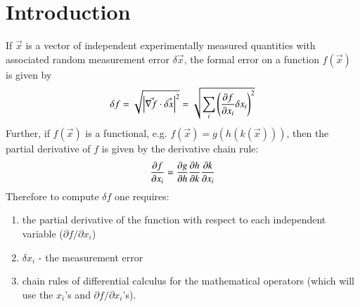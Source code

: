 \documentclass[11pt]{article}
\begin{document}
\newpage
\tableofcontents
\newpage
            
            
            
            

\section{Introduction}

If $\vec x$ is a vector of independent experimentally measured
quantities with associated random measurement error $\delta \vec
x$, the formal error on a function $f(\vec x)$ is given by
\begin{equation}
  \delta f = \sqrt{\left| \vec{\nabla f} \cdot \vec{\delta x}\right|^2} = \sqrt{\sum_i {\left( {\partial f \over {\partial x_i}} 
        \delta x_i \right)}^2}
\label{FERR}
\end{equation}
Further, if $f(\vec x)$ is a functional, e.g. $f(\vec x)=g(h(k(\vec
x)))$, then the partial derivative of $f$ is given by the derivative
chain rule:
\begin{equation}
{\partial f \over \partial x_i} = {\partial g \over \partial h} 
{\partial h \over \partial k} {\partial k \over \partial x_i}
\label{DFUNCTIONAL}
\end{equation}
Therefore to compute $\delta f$ one requires:
\begin{enumerate}
\item the partial derivative of the function with respect to each
independent variable ($\partial f / \partial x_i$)
\item $\delta x_i$ - the measurement error
\item chain rules of differential calculus for the
mathematical operators (which will use the $x_i$'s and $\partial f /
\partial x_i$'s).  
\end{enumerate}
\end{document}
